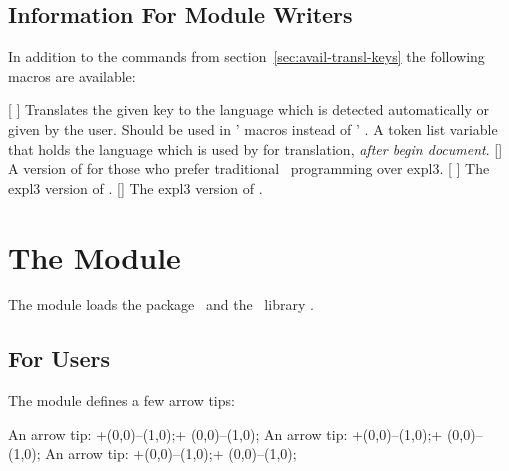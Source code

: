 \documentclass{chemmacros-manual}
\begin{document}
\subsection{Information For Module Writers}

In addition to the commands from section~\vref{sec:avail-transl-keys} the
following macros are available:
\begin{commands}
  \expandable{}[ ]
    Translates the given key to the language which is detected automatically
    or given by the user.  Should be used in \chemmacros' macros instead of
    ' .
    A token list variable that holds the language which is used by
     for translation, \emph{after begin
      document}.
  []
    A version of  for those who prefer
    traditional \LaTeXe\ programming over expl3.
  [%
    ]
    The expl3 version of .
  []
    The expl3 version of .
\end{commands}

\section{The  Module}\label{sec:tikz-module}

The  module loads the  package~\cite{pkg:pgf} and
the \TikZ\ library .

\subsection{For Users}
The  module defines a few arrow tips:
\begin{tikzcode}
    An arrow tip: \verbcode+\tikz\draw[-el](0,0)--(1,0);+
    \tikz\draw[-el](0,0)--(1,0);
    An arrow tip: \verbcode+\tikz\draw[-left el](0,0)--(1,0);+
    \tikz\draw[-left el](0,0)--(1,0);
    An arrow tip: \verbcode+\tikz\draw[-right el](0,0)--(1,0);+
    \tikz\draw[-right el](0,0)--(1,0);
\end{tikzcode}
\end{document}
